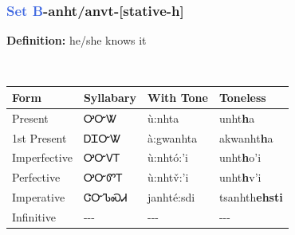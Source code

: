 \subsubsection*{\textcolor{RoyalBlue}{Set B}{-}\textbf{anht/anvt}{-}[stative-h]}
\nopagebreak
\textbf{Definition: } he/she knows it
\\[0.5em]
\begin{tabularx}{\textwidth}{l X X X}%
\toprule%
\textbf{Form}&\textbf{Syllabary}&\textbf{With Tone}&\textbf{Toneless}\\%
\midrule%
Present&ᎤᏅᏔ&ù:nhta&unht\textbf{h}a\\%
1st Present&ᎠᏆᏅᏔ&à:gwanhta&akwanht\textbf{h}a\\%
Imperfective&ᎤᏅᏙᎢ&ù:nhtó:’i&unht\textbf{h}o'i\\%
Perfective&ᎤᏅᏛᎢ&ù:nhtv̌:’i&unht\textbf{h}v'i\\%
Imperative&ᏣᏅᏖᏍᏗ&janhté:sdi&tsanhth\textbf{ehsti}\\%
Infinitive&{-}{-}{-}&{-}{-}{-}&{-}{-}{-}\\%
\bottomrule%
\end{tabularx}
\\[1em]